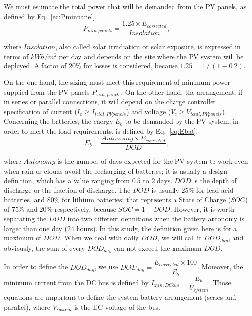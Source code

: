 \documentclass[journal]{IEEEtran}
\begin{document}
We must estimate the total power that will be demanded from the PV panels, as defined by Eq.~\eqref{eq:Pminpanel}.
%
\begin{equation}
\label{eq:Pminpanel}
P_{min,panels} = \dfrac{1.25 \times E_{corrected}}{Insolation},
\end{equation}

\noindent where $Insolation$, also called solar irradiation or solar exposure, is expressed in terms of $kWh/m^{2}$ per day and depends on the site where the PV system will be deployed. A factor of $20$\% for losses is considered, because $1.25 = 1 \mathbin{/} (1 - 0.2)$.

On the one hand, the sizing must meet this requirement of minimum power supplied from the PV panels $P_{min,panels}$. On the other hand, the arrangement, if in series or parallel connections, it will depend on the charge controller specification of current ($I_{c} \geq I_{total,PVpanels}$) and voltage ($V_{c} \geq V_{total,PVpanels}$).
%
Concerning the batteries, the energy $E_{b}$ to be demanded by the PV system, in order to meet the load requirements, is defined by Eq.~\eqref{eq:Ebat}.
%
\begin{equation}
\label{eq:Ebat}
E_{b} = \dfrac{Autonomy \times E_{corrected}}{DOD},
\end{equation}

\noindent where $Autonomy$ is the number of days expected for the PV system to work even when rain or clouds avoid the recharging of batteries; it is usually a design definition, which has a value ranging from $0.5$ to $2$ days. $DOD$ is the depth of discharge or the fraction of discharge. The $DOD$ is usually $25$\% for lead-acid batteries, and $80$\% for lithium batteries; that represents a State of Charge ($SOC$) of $75$\% and $20$\% respectively, because $SOC=1-DOD$. However, it is worth separating the $DOD$ into two different definitions when the battery autonomy is larger than one day ($24$ hours). In this study, the definition given here is for a maximum of $DOD$. When we deal with daily $DOD$, we will call it $DOD_{day}$, and obviously, the sum of every $DOD_{day}$ can not exceed the maximum $DOD$.

In order to define the $DOD_{day}$, we use $DOD_{day} = \dfrac{E_{corrected} \times 100}{E_{b}}$. Moreover, the minimum current from the DC bus is defined by $I_{min,DCbus} = \dfrac{E_{b}}{V_{system}}$. Those equations are important to define the system battery arrangement (series and parallel), where $V_{system}$ is the DC voltage of the bus. 
\end{document}
